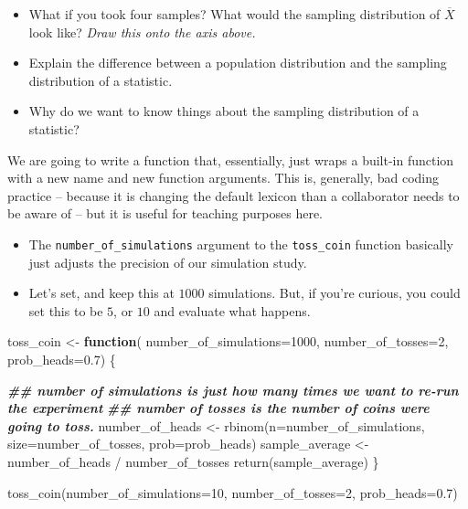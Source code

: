 \documentclass[
]{book}
\newenvironment{Shaded}{\begin{snugshade}}{\end{snugshade}}
\newcommand{\AttributeTok}[1]{\textcolor[rgb]{0.77,0.63,0.00}{#1}}
\newcommand{\ControlFlowTok}[1]{\textcolor[rgb]{0.13,0.29,0.53}{\textbf{#1}}}
\newcommand{\DecValTok}[1]{\textcolor[rgb]{0.00,0.00,0.81}{#1}}
\newcommand{\DocumentationTok}[1]{\textcolor[rgb]{0.56,0.35,0.01}{\textbf{\textit{#1}}}}
\newcommand{\FloatTok}[1]{\textcolor[rgb]{0.00,0.00,0.81}{#1}}
\newcommand{\FunctionTok}[1]{\textcolor[rgb]{0.00,0.00,0.00}{#1}}
\newcommand{\NormalTok}[1]{#1}
\newcommand{\OtherTok}[1]{\textcolor[rgb]{0.56,0.35,0.01}{#1}}
\newcommand{\SpecialCharTok}[1]{\textcolor[rgb]{0.00,0.00,0.00}{#1}}
\providecommand{\tightlist}{%
  \setlength{\itemsep}{0pt}\setlength{\parskip}{0pt}}
\theoremstyle{definition}
\theoremstyle{definition}
\theoremstyle{definition}
\theoremstyle{definition}
\theoremstyle{remark}
\begin{document}
\begin{itemize}
\tightlist
\item
  What if you took four samples? What would the sampling distribution of \(\overline{X}\) look like? \emph{Draw this onto the axis above.}
\item
  Explain the difference between a population distribution and the sampling distribution of a statistic.
\item
  Why do we want to know things about the sampling distribution of a statistic?
\end{itemize}

We are going to write a function that, essentially, just wraps a built-in function with a new name and new function arguments. This is, generally, bad coding practice -- because it is changing the default lexicon than a collaborator needs to be aware of -- but it is useful for teaching purposes here.

\begin{itemize}
\tightlist
\item
  The \texttt{number\_of\_simulations} argument to the \texttt{toss\_coin} function basically just adjusts the precision of our simulation study.
\item
  Let's set, and keep this at \(1000\) simulations. But, if you're curious, you could set this to be \(5\), or \(10\) and evaluate what happens.
\end{itemize}

\begin{Shaded}
\begin{Highlighting}[]
\NormalTok{toss\_coin }\OtherTok{\textless{}{-}} \ControlFlowTok{function}\NormalTok{(}
    \AttributeTok{number\_of\_simulations=}\DecValTok{1000}\NormalTok{, }
    \AttributeTok{number\_of\_tosses=}\DecValTok{2}\NormalTok{, }
    \AttributeTok{prob\_heads=}\FloatTok{0.7}\NormalTok{) \{ }
  
  \DocumentationTok{\#\# number of simulations is just how many times we want to re{-}run the experiment}
  \DocumentationTok{\#\# number of tosses is the number of coins we\textquotesingle{}re going to toss.}
\NormalTok{  number\_of\_heads }\OtherTok{\textless{}{-}} \FunctionTok{rbinom}\NormalTok{(}\AttributeTok{n=}\NormalTok{number\_of\_simulations, }\AttributeTok{size=}\NormalTok{number\_of\_tosses, }\AttributeTok{prob=}\NormalTok{prob\_heads)}
\NormalTok{  sample\_average  }\OtherTok{\textless{}{-}}\NormalTok{ number\_of\_heads }\SpecialCharTok{/}\NormalTok{ number\_of\_tosses}
  \FunctionTok{return}\NormalTok{(sample\_average)}
\NormalTok{\}}

\FunctionTok{toss\_coin}\NormalTok{(}\AttributeTok{number\_of\_simulations=}\DecValTok{10}\NormalTok{, }\AttributeTok{number\_of\_tosses=}\DecValTok{2}\NormalTok{, }\AttributeTok{prob\_heads=}\FloatTok{0.7}\NormalTok{)}
\end{Highlighting}
\end{Shaded}
\end{document}
